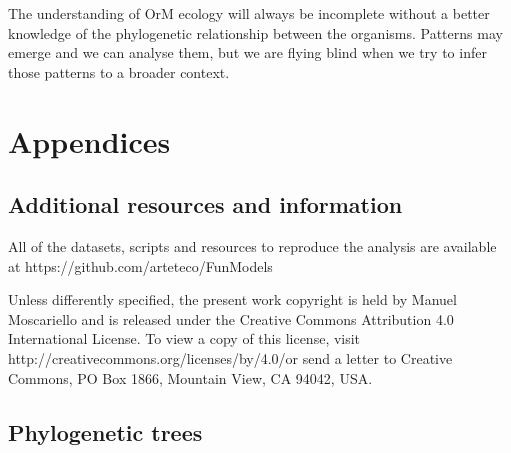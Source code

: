 The understanding of OrM ecology will always be incomplete without a better knowledge of the phylogenetic relationship between the organisms. Patterns may emerge and we can analyse them, but we are flying blind when we try to infer those patterns to a broader context.

\part{Appendices}
\label{appendices}

\chapter{Additional resources and information}
\label{additionalresourcesandinformation}

All of the datasets, scripts and resources to reproduce the analysis are available at https:\slash \slash github.com\slash arteteco\slash FunModels

Unless differently specified, the present work copyright is held by Manuel Moscariello and is released under the Creative Commons Attribution 4.0 International License. To view a copy of this license, visit http:\slash \slash creativecommons.org\slash licenses\slash by\slash 4.0\slash  or send a letter to Creative Commons, PO Box 1866, Mountain View, CA 94042, USA.

\chapter{Phylogenetic trees}
\label{phylogenetictrees}

